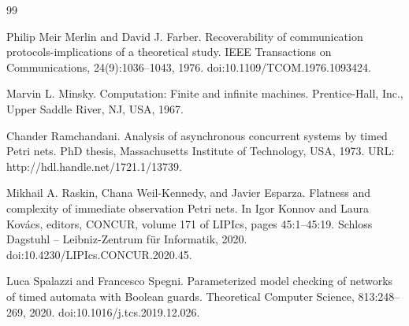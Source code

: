 \begin{thebibliography}{99}
\par\noindent    Philip Meir Merlin and David J. Farber.  Recoverability of communication protocols-implications of a theoretical study.  IEEE Transactions on Communications, 24(9):1036--1043, 1976.  doi:10.1109/TCOM.1976.1093424.  

\par\noindent    Marvin L. Minsky.  Computation: Finite and infinite machines.  Prentice-Hall, Inc., Upper Saddle River, NJ, USA, 1967.  

\par\noindent    Chander Ramchandani.  Analysis of asynchronous concurrent systems by timed Petri nets.  PhD thesis, Massachusetts Institute of Technology, USA, 1973.  URL: http://hdl.handle.net/1721.1/13739.  

\par\noindent    Mikhail A. Raskin, Chana Weil-Kennedy, and Javier Esparza.  Flatness and complexity of immediate observation Petri nets.  In Igor Konnov and Laura Kovács, editors, CONCUR, volume 171 of LIPIcs, pages 45:1--45:19. Schloss Dagstuhl -- Leibniz-Zentrum für Informatik, 2020.  doi:10.4230/LIPIcs.CONCUR.2020.45.  

\par\noindent    Luca Spalazzi and Francesco Spegni.  Parameterized model checking of networks of timed automata with Boolean guards.  Theoretical Computer Science, 813:248--269, 2020.  doi:10.1016/j.tcs.2019.12.026.  

\end{thebibliography}
